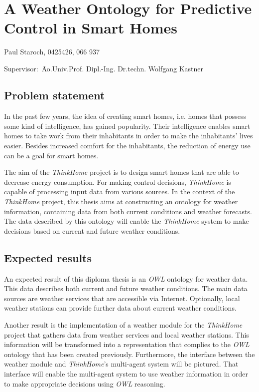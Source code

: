\documentclass{scrartcl}
\begin{document}
~\vspace{0.5cm}
\section*{A Weather Ontology for Predictive Control in Smart Homes}
Paul Staroch, 0425426, 066 937
\begin{tabbing}
Supervisor:\ \= Ao.Univ.Prof. Dipl.-Ing. Dr.techn. Wolfgang Kastner\\
\end{tabbing}

\subsection*{Problem statement}
In the past few years, the idea of creating smart homes, i.e. homes that possess some kind of intelligence, has gained popularity.
Their intelligence enables smart homes to take work from their inhabitants in order to make the inhabitants' lives easier.
Besides increased comfort for the inhabitants, the reduction of energy use can be a goal for smart homes.

The aim of the \textit{ThinkHome} project \cite{CR2011-TH_Journal} \cite{CR2010-DEST_ThinkHome} is to design smart homes that are able to decrease energy consumption.
For making control decisions, \textit{ThinkHome} is capable of processing input data from various sources.
In the context of the \textit{ThinkHome} project, this thesis aims at constructing an ontology for weather information, containing data from both current conditions and weather forecasts.
The data described by this ontology will enable the \textit{ThinkHome} system to make decisions based on current and future weather conditions.

\subsection*{Expected results}
An expected result of this diploma thesis is an \textit{OWL} ontology for weather data. This data describes both current and future weather conditions.
The main data sources are weather services that are accessible via Internet. Optionally, local weather stations can provide further data about current weather conditions.

Another result is the implementation of a weather module for the \textit{ThinkHome} project that gathers data from weather services and local weather stations.
This information will be transformed into a representation that complies to the \textit{OWL} ontology that has been created previously.
Furthermore, the interface between the weather module and \textit{ThinkHome}'s multi-agent system will be pictured.
That interface will enable the multi-agent system to use weather information in order to make appropriate decisions using \textit{OWL} reasoning.
\end{document}
